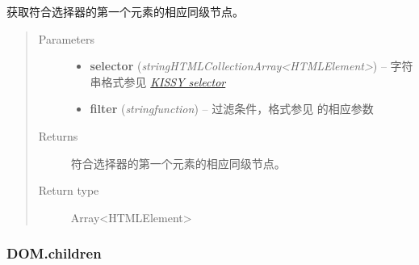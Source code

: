 \documentclass[letterpaper,10pt,english]{sphinxmanual}
\begin{document}
\begin{fulllineitems}
\label{api/core/dom/siblings:DOM.siblings}
获取符合选择器的第一个元素的相应同级节点。
\begin{quote}\begin{description}
\item[{Parameters}] \leavevmode\begin{itemize}
\item {}
\textbf{selector} (\emph{string\textbar{}HTMLCollection\textbar{}Array\textless{}HTMLElement\textgreater{}}) -- 字符串格式参见 {\hyperref[api/core/dom/selector:dom-selector]{\emph{KISSY selector}}}

\item {}
\textbf{filter} (\emph{string\textbar{}function}) -- 过滤条件，格式参见 {\hyperref[api/core/dom/filter:DOM.filter]{}} 的相应参数

\end{itemize}

\item[{Returns}] \leavevmode
符合选择器的第一个元素的相应同级节点。

\item[{Return type}] \leavevmode
Array\textless{}HTMLElement\textgreater{}

\end{description}\end{quote}

\end{fulllineitems}



\subsubsection{DOM.children}
\label{api/core/dom/children:dom-children}\label{api/core/dom/children::doc}
\end{document}

